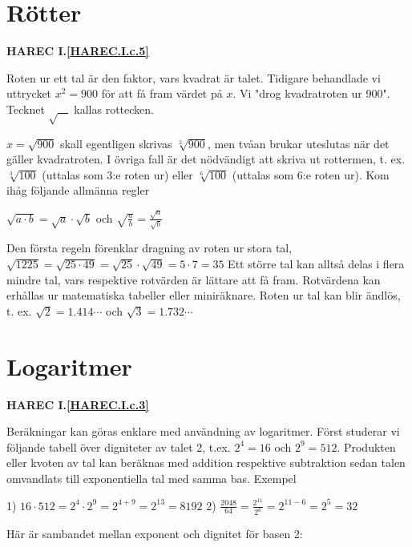 \section{Rötter}
\textbf{HAREC I.\ref{HAREC.I.c.5}\label{myHAREC.I.c.5}}

Roten ur ett tal är den faktor, vars kvadrat är talet.
Tidigare behandlade vi uttrycket \(x^2 = 900\) för att få fram värdet på \(x\). Vi
"drog kvadratroten ur 900".
Tecknet \(\sqrt{\ \ \ \ }\) kallas rottecken.

\(x = \sqrt{900}\) skall egentligen skrivas \(\sqrt[2]{900}\),
men tvåan brukar uteslutas när det gäller kvadratroten. I övriga fall är det
nödvändigt att skriva ut rottermen, t. ex. \(\sqrt[3]{100}\) (uttalas
som 3:e roten ur) eller \(\sqrt[6]{100}\) (uttalas som 6:e roten ur).
Kom ihåg följande allmänna regler

\(\sqrt{a \cdot b} = \sqrt{a} \cdot \sqrt{b}\) och
\(\sqrt{\frac{a}{b}} = \frac{\sqrt{a}}{\sqrt{b}}\)

Den första regeln förenklar dragning av roten ur stora tal,
\(\sqrt{1225} = \sqrt{25 \cdot 49} = \sqrt{25} \cdot \sqrt{49} = 5 \cdot 7 = 35\)
Ett större tal kan alltså delas i flera mindre tal, vars respektive rotvärden är
lättare att få fram. Rotvärdena kan erhållas ur matematiska tabeller eller
miniräknare.
Roten ur tal kan blir ändlös, t. ex.
\(\sqrt{2} = 1.414\cdots\) och \(\sqrt{3} = 1.732\cdots\)

\section{Logaritmer}
\textbf{HAREC I.\ref{HAREC.I.c.3}\label{myHAREC.I.c.3}}

Beräkningar kan göras enklare med användning av logaritmer.
Först studerar vi följande tabell över digniteter av talet 2,
t.ex. \(2^4 = 16\) och \(2^9 = 512\).
Produkten eller kvoten av tal kan beräknas med addition respektive subtraktion
sedan talen omvandlats till exponentiella tal med samma bas.
Exempel

1) \(16 \cdot 512 = 2^4 \cdot 2^9 =2^{4+9} = 2^{13} = 8192\)
2) \(\frac{2048}{64} = \frac{2^{11}}{2^6} =2^{11-6} =2^5 = 32\)

Här är sambandet mellan exponent och dignitet för basen 2:

